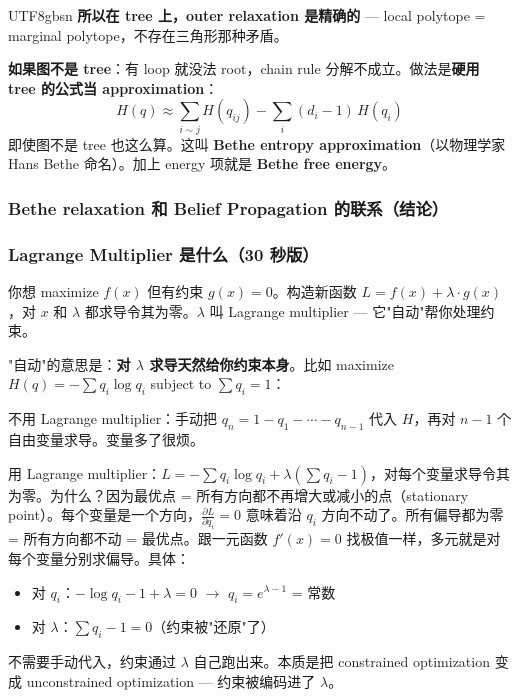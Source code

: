 \documentclass[11pt]{article}
\begin{document}
\begin{CJK}{UTF8}{gbsn}
\textbf{所以在 tree 上，outer relaxation 是精确的} --- local polytope = marginal polytope，不存在三角形那种矛盾。

\textbf{如果图不是 tree}：有 loop 就没法 root，chain rule 分解不成立。做法是\textbf{硬用 tree 的公式当 approximation}：
\[
  H(q) \approx \sum_{i \sim j} H(q_{ij}) - \sum_i (d_i - 1)\, H(q_i)
\]
即使图不是 tree 也这么算。这叫 \textbf{Bethe entropy approximation}（以物理学家 Hans Bethe 命名）。加上 energy 项就是 \textbf{Bethe free energy}。

\subsubsection{Bethe relaxation 和 Belief Propagation 的联系（结论）}

\noindent{}

\subsubsection{Lagrange Multiplier 是什么（30 秒版）}

你想 maximize $f(x)$ 但有约束 $g(x) = 0$。构造新函数 $L = f(x) + \lambda \cdot g(x)$，对 $x$ 和 $\lambda$ 都求导令其为零。$\lambda$ 叫 Lagrange multiplier --- 它"自动"帮你处理约束。

"自动"的意思是：\textbf{对 $\lambda$ 求导天然给你约束本身}。比如 maximize $H(q) = -\sum q_i \log q_i$ subject to $\sum q_i = 1$：

不用 Lagrange multiplier：手动把 $q_n = 1 - q_1 - \cdots - q_{n-1}$ 代入 $H$，再对 $n-1$ 个自由变量求导。变量多了很烦。

用 Lagrange multiplier：$L = -\sum q_i \log q_i + \lambda(\sum q_i - 1)$，对每个变量求导令其为零。为什么？因为最优点 = 所有方向都不再增大或减小的点（stationary point）。每个变量是一个方向，$\frac{\partial L}{\partial q_i} = 0$ 意味着沿 $q_i$ 方向不动了。所有偏导都为零 = 所有方向都不动 = 最优点。跟一元函数 $f'(x)=0$ 找极值一样，多元就是对每个变量分别求偏导。具体：
\begin{itemize}[nosep]
  \item 对 $q_i$：$-\log q_i - 1 + \lambda = 0$ $\to$ $q_i = e^{\lambda - 1}$ = 常数
  \item 对 $\lambda$：$\sum q_i - 1 = 0$（约束被"还原"了）
\end{itemize}
不需要手动代入，约束通过 $\lambda$ 自己跑出来。本质是把 constrained optimization 变成 unconstrained optimization --- 约束被编码进了 $\lambda$。


\end{CJK}
\end{document}
